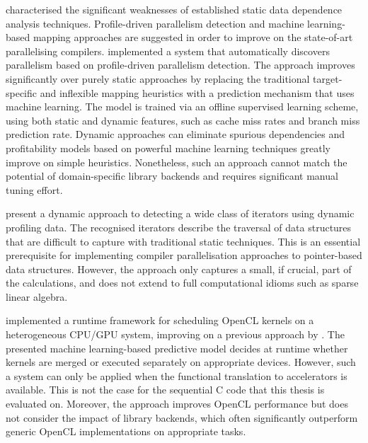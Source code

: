     \citet{Tournavitis:2009:THA:1542476.1542496} characterised the significant
    weaknesses of established static data dependence analysis techniques.
    Profile-driven parallelism detection and machine learning-based mapping
    approaches are suggested in order to improve on the state-of-art
    parallelising compilers.
    \citet{Wang:2014:IPP:2591460.2579561} implemented a system that
    automatically discovers parallelism based on profile-driven parallelism
    detection.
    The approach improves significantly over purely static approaches by
    replacing the traditional target-specific and inflexible mapping heuristics
    with a prediction mechanism that uses machine learning.
    The model is trained via an offline supervised learning scheme, using both
    static and dynamic features, such as cache miss rates and branch miss
    prediction rate.
    Dynamic approaches can eliminate spurious dependencies and profitability
    models based on powerful machine learning techniques greatly improve on
    simple heuristics.
    Nonetheless, such an approach cannot match the potential of domain-specific
    library backends and requires significant manual tuning effort.

    \citet{Manilov:2018:GPI:3178372.3179511} present a dynamic approach to
    detecting a wide class of iterators using dynamic profiling data.
    The recognised iterators describe the traversal of data structures that are
    difficult to capture with traditional static techniques.
    This is an essential prerequisite for implementing compiler parallelisation
    approaches to pointer-based data structures.
    However, the approach only captures a small, if crucial, part of the
    calculations, and does not extend to full computational idioms such
    as sparse linear algebra.

    \citet{Wen:2017:MSM:3038228.3038235} implemented a runtime framework for
    scheduling OpenCL kernels on a heterogeneous CPU/GPU system, improving on
    a previous approach by \citet{7116910}.
    The presented machine learning-based predictive model decides at runtime
    whether kernels are merged or executed separately on appropriate devices.
    However, such a system can only be applied when the functional translation
    to accelerators is available.
    This is not the case for the sequential C code that this thesis is evaluated
    on.
    Moreover, the approach improves OpenCL performance but does not consider
    the impact of library backends, which often significantly outperform generic
    OpenCL implementations on appropriate tasks.

